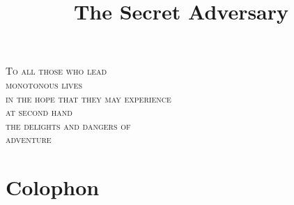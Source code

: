 \documentclass[
paper=5.5in:8.5in,
]{scrbook}
\title{The Secret Adversary}
\begin{document}
\frontmatter

 \pagestyle{plain}
\tableofcontents

\chapter*{}
\vspace*{5em}
\begin{center}\Large\noindent\scshape 
To all those who lead\\
monotonous lives\\
in the hope that they may experience\\
at second hand\\
the delights and dangers of\\
adventure
\end{center}
\vfill
\thispagestyle{empty}

 \pagestyle{headings}
\mainmatter
































%
\chapter*{Colophon}

\centering
\end{document}
